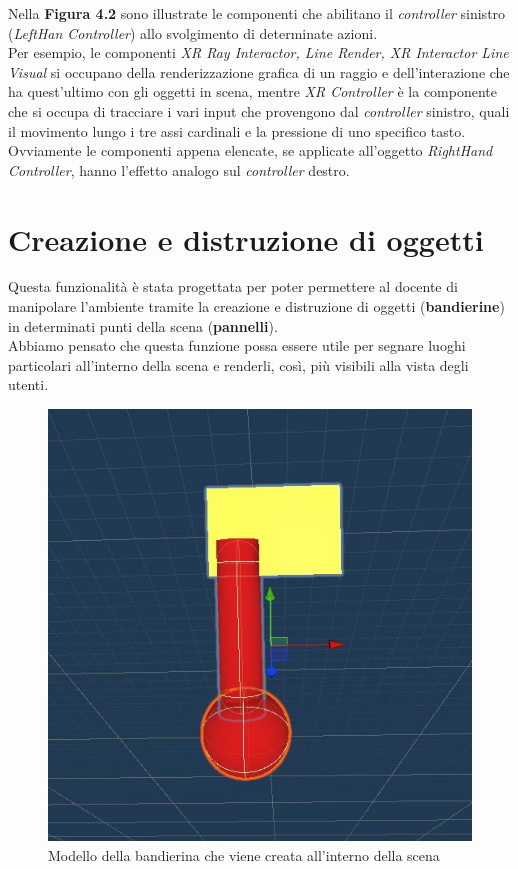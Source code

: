Nella \textbf{Figura 4.2} sono illustrate le componenti che abilitano il \textit{controller} sinistro (\textit{LeftHan Controller}) allo svolgimento di determinate azioni.
\\Per esempio, le componenti \textit{XR Ray Interactor, Line Render, XR Interactor Line Visual} si occupano della renderizzazione grafica di un raggio e dell'interazione che ha quest'ultimo con gli oggetti in scena, mentre \textit{XR Controller} è la componente che si occupa di tracciare i vari input che provengono dal \textit{controller} sinistro, quali il movimento lungo i tre assi cardinali e la pressione di uno specifico tasto.
\\Ovviamente le componenti appena elencate, se applicate all'oggetto \textit{RightHand Controller}, hanno l'effetto analogo sul \textit{controller} destro.
\section{Creazione e distruzione di oggetti}
Questa funzionalità è stata progettata per poter permettere al docente di manipolare l'ambiente tramite la creazione e distruzione di oggetti (\textbf{bandierine}) in determinati punti della scena (\textbf{pannelli}).
\\Abbiamo pensato che questa funzione possa essere utile per segnare luoghi particolari all'interno della scena e renderli, così, più visibili alla vista degli utenti.
\begin{figure}[H]
    \centering
    \includegraphics[scale = 0.4]{Immagini/bandierina.jpg}
    \caption{Modello della bandierina che viene creata all'interno della scena}
    \label{fig:my_label}
\end{figure}
